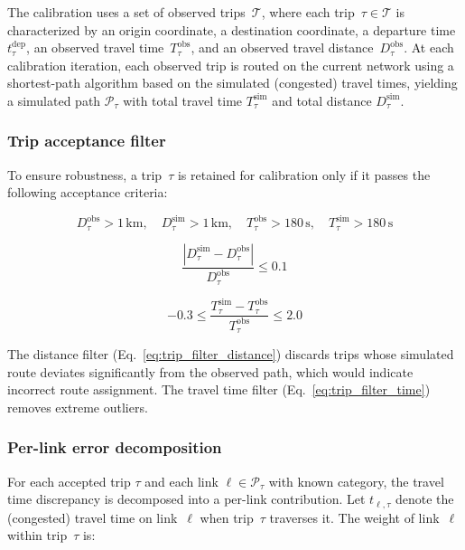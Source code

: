The calibration uses a set of observed trips~$\mathcal{T}$, where each trip~$\tau \in \mathcal{T}$ is characterized by an origin coordinate, a destination coordinate, a departure time~$t_\tau^{\text{dep}}$, an observed travel time~$T_\tau^{\text{obs}}$, and an observed travel distance~$D_\tau^{\text{obs}}$. At each calibration iteration, each observed trip is routed on the current network using a shortest-path algorithm based on the simulated (congested) travel times, yielding a simulated path $\mathcal{P}_\tau$ with total travel time $T_\tau^{\text{sim}}$ and total distance $D_\tau^{\text{sim}}$.

\subsubsection{Trip acceptance filter}

To ensure robustness, a trip~$\tau$ is retained for calibration only if it passes the following acceptance criteria:

\begin{equation}
    D_\tau^{\text{obs}} > 1\,\text{km}, \quad
    D_\tau^{\text{sim}} > 1\,\text{km}, \quad
    T_\tau^{\text{obs}} > 180\,\text{s}, \quad
    T_\tau^{\text{sim}} > 180\,\text{s}
    \label{eq:trip_filter_1}
\end{equation}

\begin{equation}
    \frac{|D_\tau^{\text{sim}} - D_\tau^{\text{obs}}|}{D_\tau^{\text{obs}}} \leq 0.1
    \label{eq:trip_filter_distance}
\end{equation}

\begin{equation}
    -0.3 \leq \frac{T_\tau^{\text{sim}} - T_\tau^{\text{obs}}}{T_\tau^{\text{obs}}} \leq 2.0
    \label{eq:trip_filter_time}
\end{equation}

The distance filter (Eq.~\ref{eq:trip_filter_distance}) discards trips whose simulated route deviates significantly from the observed path, which would indicate incorrect route assignment. The travel time filter (Eq.~\ref{eq:trip_filter_time}) removes extreme outliers.

\subsubsection{Per-link error decomposition}

For each accepted trip $\tau$ and each link $\ell \in \mathcal{P}_\tau$ with known category, the travel time discrepancy is decomposed into a per-link contribution. Let $t_{\ell,\tau}$ denote the (congested) travel time on link~$\ell$ when trip~$\tau$ traverses it. The weight of link~$\ell$ within trip~$\tau$ is:


